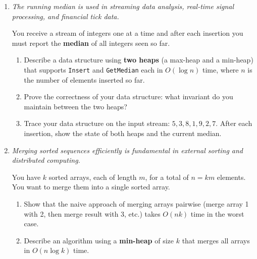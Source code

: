 \documentclass[9pt]{book}
\begin{document}
\begin{enumerate}[label=\arabic*.]


\item \textit{The running median is used in streaming data analysis, real-time signal processing, and financial tick data.}

You receive a stream of integers one at a time and after each insertion you must report the \textbf{median} of all integers seen so far.

\begin{enumerate}
    \item Describe a data structure using \textbf{two heaps} (a max-heap and a min-heap) that supports \texttt{Insert} and \texttt{GetMedian} each in $O(\log n)$ time, where $n$ is the number of elements inserted so far.
    \item Prove the correctness of your data structure: what invariant do you maintain between the two heaps?
    \item Trace your data structure on the input stream: $5, 3, 8, 1, 9, 2, 7$. After each insertion, show the state of both heaps and the current median.
\end{enumerate}

\item \textit{Merging sorted sequences efficiently is fundamental in external sorting and distributed computing.}

You have $k$ sorted arrays, each of length $m$, for a total of $n = km$ elements. You want to merge them into a single sorted array.

\begin{enumerate}
    \item Show that the naive approach of merging arrays pairwise (merge array 1 with 2, then merge 
    result with 3, etc.) takes $O(nk)$ time in the worst case.
    \item Describe an algorithm using a \textbf{min-heap} of size $k$ that merges all arrays in 
    $O(n \log k)$ time.
\end{enumerate}


\end{enumerate}
\end{document}
